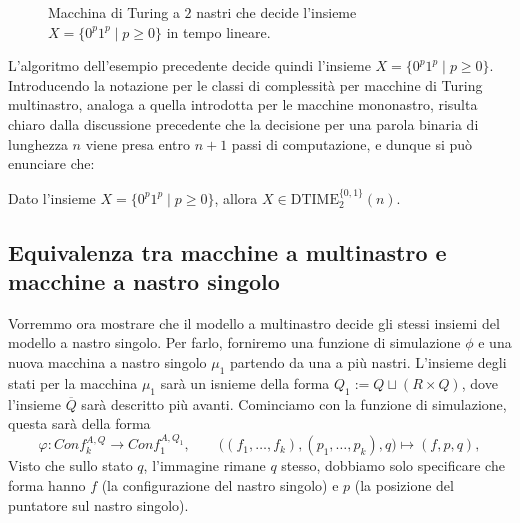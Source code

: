 \begin{exam}
\begin{figure}[H]
\caption{Macchina di Turing a $2$ nastri che decide l'insieme $X=\{0^p1^p\mid p\geq 0\}$ in tempo lineare.}
\label{fig:turing-2nastri}
\end{figure}
\end{exam}
L'algoritmo dell'esempio 
precedente decide quindi 
l'insieme $X=\{0^p1^p\mid p\geq 0\}$. Introducendo la notazione per le classi di complessità per macchine di Turing multinastro, analoga a quella introdotta per le macchine mononastro, risulta chiaro dalla discussione precedente che la decisione per una parola binaria di lunghezza $n$ viene presa entro $n+1$ passi di computazione, e dunque si può enunciare che:

\begin{lemm}
Dato l'insieme $X=\{0^p1^p\mid p\geq 0\}$, allora $X\in\mathrm{DTIME}_2^{\{0,1\}}(n)$.
\end{lemm}

\subsection{Equivalenza tra macchine a multinastro e macchine a nastro singolo}

Vorremmo ora mostrare che il modello a multinastro decide
gli stessi insiemi del modello a nastro singolo.
Per farlo, forniremo una funzione di simulazione $\phi$
e una nuova macchina a nastro singolo $\mu_1$ partendo da una a più nastri.
L'insieme degli stati per la macchina 
$\mu_1$ sarà un isnieme della forma 
$Q_1:=Q \sqcup (R \times Q)$,
dove l'insieme $\overline{Q}$ sarà descritto più avanti.
Cominciamo con la funzione di simulazione, questa sarà della forma
\[
  \varphi\colon {Conf}^{A,Q}_k \longrightarrow {Conf}^{A,Q_1}_1,
  \qquad
  \big((f_1,\dots,f_k),(p_1,\dots,p_k),q\big) \longmapsto (f,p,q),
\]
Visto che sullo stato $q$, l'immagine rimane $q$
stesso, dobbiamo solo 
specificare che forma hanno 
$f$ (la configurazione del nastro 
singolo) e $p$ (la posizione del 
puntatore sul nastro singolo).






